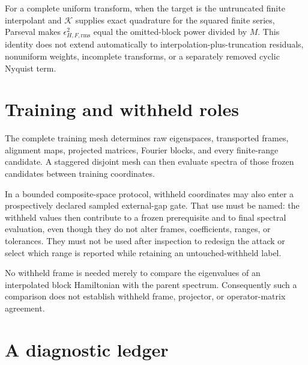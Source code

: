For a complete uniform transform, when the target is the untruncated finite interpolant
and $\mathcal K$ supplies exact quadrature for the squared finite series, Parseval makes
$\epsilon_{H,F,\mathrm{rms}}^2$ equal the omitted-block power divided by $M$. This
identity does not extend automatically to interpolation-plus-truncation residuals,
nonuniform weights, incomplete transforms, or a separately removed cyclic Nyquist term.

\section{Training and withheld roles}

The complete training mesh determines raw eigenspaces, transported frames,
alignment maps, projected matrices, Fourier blocks, and every finite-range
candidate. A staggered disjoint mesh can then evaluate spectra of those frozen
candidates between training coordinates.

In a bounded composite-space protocol, withheld coordinates may also enter a
prospectively declared sampled external-gap gate. That use must be named: the
withheld values then contribute to a frozen prerequisite and to final spectral
evaluation, even though they do not alter frames, coefficients, ranges, or
tolerances. They must not be used after inspection to redesign the attack or
select which range is reported while retaining an untouched-withheld label.

No withheld frame is needed merely to compare the eigenvalues of an
interpolated block Hamiltonian with the parent spectrum. Consequently such a
comparison does not establish withheld frame, projector, or operator-matrix
agreement.

\section{A diagnostic ledger}

